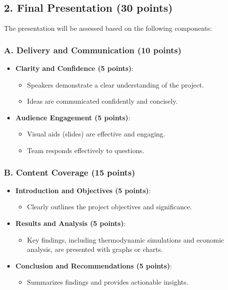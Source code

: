 \documentclass[11pt]{article}
\begin{document}
\subsection*{2. Final Presentation (30 points)}
The presentation will be assessed based on the following components:

\subsubsection*{A. Delivery and Communication (10 points)}
\begin{itemize}
    \item \textbf{Clarity and Confidence (5 points)}:
    \begin{itemize}
        \item Speakers demonstrate a clear understanding of the project.
        \item Ideas are communicated confidently and concisely.
    \end{itemize}
    \item \textbf{Audience Engagement (5 points)}:
    \begin{itemize}
        \item Visual aids (slides) are effective and engaging.
        \item Team responds effectively to questions.
    \end{itemize}
\end{itemize}

\subsubsection*{B. Content Coverage (15 points)}
\begin{itemize}
    \item \textbf{Introduction and Objectives (5 points)}:
    \begin{itemize}
        \item Clearly outlines the project objectives and significance.
    \end{itemize}
    \item \textbf{Results and Analysis (5 points)}:
    \begin{itemize}
        \item Key findings, including thermodynamic simulations and economic analysis, are presented with graphs or charts.
    \end{itemize}
    \item \textbf{Conclusion and Recommendations (5 points)}:
    \begin{itemize}
        \item Summarizes findings and provides actionable insights.
    \end{itemize}
\end{itemize}
\end{document}
